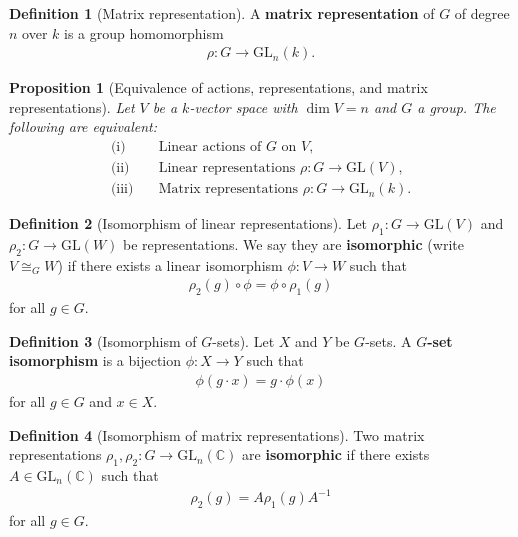 \documentclass[titlepage]{article}
\theoremstyle{plain}
\newtheorem{proposition}[theorem]{Proposition}
\theoremstyle{definition}
\newtheorem{definition}{Definition}[section]
\theoremstyle{remark}
\theoremstyle{exercise-style}
\numberwithin{equation}{section}
\numberwithin{theorem}{section}
\numberwithin{remark}{section}
\begin{document}
\begin{definition}[Matrix representation]
    A \textbf{matrix representation} of $G$ of degree $n$ over $k$ is a group homomorphism
    \begin{align}
        \rho: G \to \mathrm{GL}_n(k).
    \end{align}
\end{definition}

\begin{proposition}[Equivalence of actions, representations, and matrix representations]
    Let $V$ be a $k$-vector space with $\dim V = n$ and $G$ a group. The following are equivalent:
    \begin{align}
        \text{(i)} & \quad \text{Linear actions of $G$ on $V$}, \\
        \text{(ii)} & \quad \text{Linear representations } \rho: G \to \mathrm{GL}(V), \\
        \text{(iii)} & \quad \text{Matrix representations } \rho: G \to \mathrm{GL}_n(k).
    \end{align}
\end{proposition}

\begin{definition}[Isomorphism of linear representations]
    Let $\rho_1: G \to \mathrm{GL}(V)$ and $\rho_2: G \to \mathrm{GL}(W)$ be representations. We say they are \textbf{isomorphic} (write $V \cong_G W$) if there exists a linear isomorphism $\phi: V \to W$ such that
    \begin{align}
        \rho_2(g) \circ \phi = \phi \circ \rho_1(g)
    \end{align}
    for all $g \in G$.
\end{definition}

\begin{definition}[Isomorphism of $G$-sets]
    Let $X$ and $Y$ be $G$-sets. A \textbf{$G$-set isomorphism} is a bijection $\phi: X \to Y$ such that
    \begin{align}
        \phi(g \cdot x) = g \cdot \phi(x)
    \end{align}
    for all $g \in G$ and $x \in X$.
\end{definition}

\begin{definition}[Isomorphism of matrix representations]
    Two matrix representations $\rho_1, \rho_2: G \to \mathrm{GL}_n(\mathbb{C})$ are \textbf{isomorphic} if there exists $A \in \mathrm{GL}_n(\mathbb{C})$ such that
    \begin{align}
        \rho_2(g) = A \rho_1(g) A^{-1}
    \end{align}
    for all $g \in G$.
\end{definition}
\end{document}
